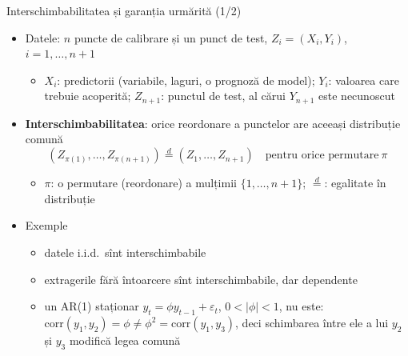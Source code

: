 \begin{frame}{Interschimbabilitatea și garanția urmărită (1/2)}
\itemsize{\small}
\begin{itemize}
    \item Datele: $n$ puncte de calibrare și un punct de test, $Z_i = (X_i, Y_i)$, $i = 1, \dots, n + 1$
    \begin{itemize}
        \item $X_i$: predictorii (variabile, laguri, o prognoză de model); $Y_i$: valoarea care trebuie acoperită; $Z_{n+1}$: punctul de test, al cărui $Y_{n+1}$ este necunoscut
    \end{itemize}
    \item \textbf{Interschimbabilitatea}: orice reordonare a punctelor are aceeași distribuție comună \[ (Z_{\pi(1)}, \dots, Z_{\pi(n+1)}) \overset{d}{=} (Z_1, \dots, Z_{n+1}) \quad \text{pentru orice permutare} \ \pi \]
    \begin{itemize}
        \item $\pi$: o permutare (reordonare) a mulțimii $\{1, \dots, n + 1\}$; $\overset{d}{=}$: egalitate în distribuție
    \end{itemize}
    \item Exemple
    \begin{itemize}
        \item datele i.i.d.\ sînt interschimbabile
        \item extragerile fără întoarcere sînt interschimbabile, dar dependente
        \item un AR(1) staționar $y_t = \phi y_{t-1} + \varepsilon_t$, $0 < |\phi| < 1$, nu este: $\mathrm{corr}(y_1, y_2) = \phi \ne \phi^2 = \mathrm{corr}(y_1, y_3)$, deci schimbarea între ele a lui $y_2$ și $y_3$ modifică legea comună
    \end{itemize}
\end{itemize}
\end{frame}

